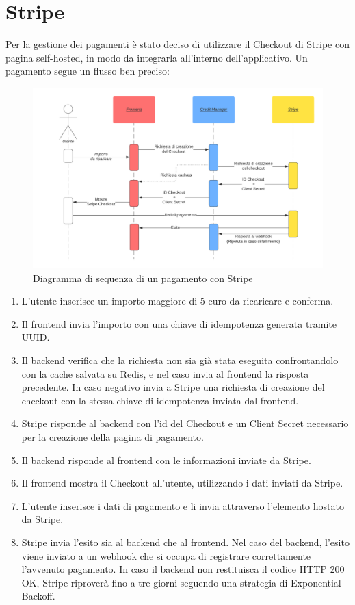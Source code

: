 \section{Stripe}
Per la gestione dei pagamenti \`e stato deciso di utilizzare il Checkout di Stripe con pagina self-hosted, in modo da integrarla all'interno dell'applicativo. Un pagamento segue un flusso ben preciso:
\begin{figure}[H]
  \centering
  \hspace*{-0.55in}\includegraphics[width=16cm]{images/stripe-pagamento-diagramma.png}
  \caption{Diagramma di sequenza di un pagamento con Stripe}
  \label{stripepayment}
\end{figure}
\begin{enumerate}
  \item L'utente inserisce un importo maggiore di 5 euro da ricaricare e conferma.
  \item Il frontend invia l'importo con una chiave di idempotenza generata tramite UUID.
  \item Il backend verifica che la richiesta non sia gi\`a stata eseguita confrontandolo con la cache salvata su Redis, e nel caso invia al frontend la risposta precedente. In caso negativo invia a Stripe una richiesta di
    creazione del checkout con la stessa chiave di idempotenza inviata dal frontend.
  \item Stripe risponde al backend con l'id del Checkout e un Client Secret necessario per la creazione della pagina di pagamento.
  \item Il backend risponde al frontend con le informazioni inviate da Stripe.
  \item Il frontend mostra il Checkout all'utente, utilizzando i dati inviati da Stripe.
  \item L'utente inserisce i dati di pagamento e li invia attraverso l'elemento hostato da Stripe.
  \item Stripe invia l'esito sia al backend che al frontend. Nel caso del backend, l'esito viene inviato a un webhook che si occupa di registrare correttamente l'avvenuto
    pagamento. In caso il backend non restituisca il codice HTTP 200 OK, Stripe riprover\`a fino a tre giorni seguendo una strategia di Exponential Backoff.
\end{enumerate}

